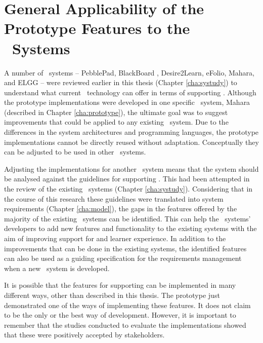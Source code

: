 \section[General Applicability]{General Applicability of the Prototype
Features to the \ep~Systems}

A number of \ep~systems -- PebblePad, BlackBoard \ep, Desire2Learn, eFolio,
Mahara, and ELGG -- were reviewed earlier in this thesis (Chapter
\ref{cha:systudy}) to understand what current \ep~technology can offer in terms
of supporting \LLLsn. Although the prototype implementations were developed in
one specific \ep~system, Mahara (described in Chapter \ref{cha:prototype}), the
ultimate goal was to suggest improvements that could be applied to any existing
\ep~system. Due to the differences in the system architectures and programming
languages, the prototype implementations cannot be directly reused without
adaptation. Conceptually they can be adjusted to be used in other \ep~systems.

Adjusting the implementations for another \ep~system means that the system
should be analysed against the guidelines for supporting \LLLsn. This had been
attempted in the review of the existing \ep~systems (Chapter \ref{cha:systudy}).
Considering that in the course of this research these guidelines were translated
into system requirements (Chapter \ref{cha:model}), the gaps in the features
offered by the majority of the existing \ep~systems can be identified. This can
help the \ep~systems' developers to add new features and functionality to the
existing systems with the aim of improving support for \LLLs and learner
experience. In addition to the improvements that can be done in the existing
systems, the identified features can also be used as a guiding specification for
the requirements management when a new \ep~system is developed.

It is possible that the features for supporting \LLLs can be implemented in many
different ways, other than described in this thesis. The prototype just
demonstrated one of the ways of implementing these features. It does not claim
to be the only or the best way of development. However, it is important to
remember that the studies conducted to evaluate the implementations showed that
these were positively accepted by stakeholders.
